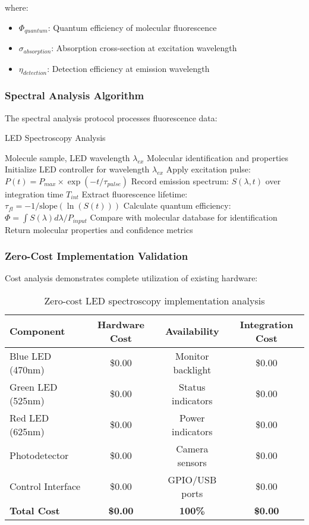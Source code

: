 where:
\begin{itemize}
\item $\Phi_{quantum}$: Quantum efficiency of molecular fluorescence
\item $\sigma_{absorption}$: Absorption cross-section at excitation wavelength
\item $\eta_{detection}$: Detection efficiency at emission wavelength
\end{itemize}

\subsubsection{Spectral Analysis Algorithm}

The spectral analysis protocol processes fluorescence data:

\begin{algorithm}[H]
\caption{LED Spectroscopy Analysis}
\begin{algorithmic}[1]
\REQUIRE Molecule sample, LED wavelength $\lambda_{ex}$
\ENSURE Molecular identification and properties
\STATE Initialize LED controller for wavelength $\lambda_{ex}$
\STATE Apply excitation pulse: $P(t) = P_{max} \times \exp(-t/\tau_{pulse})$
\STATE Record emission spectrum: $S(\lambda, t)$ over integration time $T_{int}$
\STATE Extract fluorescence lifetime: $\tau_{fl} = -1/\text{slope}(\ln(S(t)))$
\STATE Calculate quantum efficiency: $\Phi = \int S(\lambda) d\lambda / P_{input}$
\STATE Compare with molecular database for identification
\STATE Return molecular properties and confidence metrics
\end{algorithmic}
\end{algorithm}

\subsubsection{Zero-Cost Implementation Validation}

Cost analysis demonstrates complete utilization of existing hardware:

\begin{table}[H]
\centering
\begin{tabular}{|l|c|c|c|}
\hline
\textbf{Component} & \textbf{Hardware Cost} & \textbf{Availability} & \textbf{Integration Cost} \\
\hline
Blue LED (470nm) & \$0.00 & Monitor backlight & \$0.00 \\
Green LED (525nm) & \$0.00 & Status indicators & \$0.00 \\
Red LED (625nm) & \$0.00 & Power indicators & \$0.00 \\
Photodetector & \$0.00 & Camera sensors & \$0.00 \\
Control Interface & \$0.00 & GPIO/USB ports & \$0.00 \\
\hline
\textbf{Total Cost} & \textbf{\$0.00} & \textbf{100\%} & \textbf{\$0.00} \\
\hline
\end{tabular}
\caption{Zero-cost LED spectroscopy implementation analysis}
\end{table}

